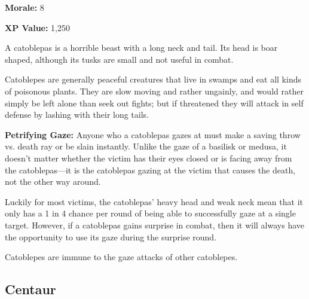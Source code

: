 \begin{multicols*}{2}
{\textbf{Morale:} 8

\textbf{XP Value:} 1,250}

A catoblepas is a horrible beast with a long neck and tail. Its head is boar shaped, although its tusks are small and not useful in combat.

Catoblepes are generally peaceful creatures that live in swamps and eat all kinds of poisonous plants. They are slow moving and rather ungainly, and would rather simply be left alone than seek out fights; but if threatened they will attack in self defense by lashing with their long tails.

\textbf{Petrifying Gaze:} Anyone who a catoblepas gazes at must make a saving throw vs. death ray or be slain instantly. Unlike the gaze of a basilisk or medusa, it doesn’t matter whether the victim has their eyes closed or is facing away from the catoblepas—it is the catoblepas gazing at the victim that causes the death, not the other way around.

Luckily for most victims, the catoblepas’ heavy head and weak neck mean that it only has a 1 in 4 chance per round of being able to successfully gaze at a single target. However, if a catoblepas gains surprise in combat, then it will always have the opportunity to use its gaze during the surprise round.

Catoblepes are immune to the gaze attacks of other catoblepes.

\subsection{Centaur}
\end{multicols*}
